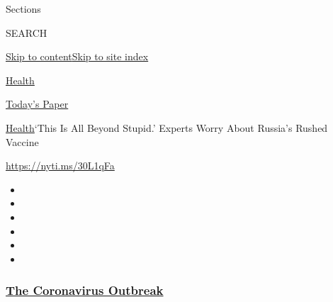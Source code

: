 Sections

SEARCH

\protect\hyperlink{site-content}{Skip to
content}\protect\hyperlink{site-index}{Skip to site index}

\href{https://www.nytimes3xbfgragh.onion/section/health}{Health}

\href{https://myaccount.nytimes3xbfgragh.onion/auth/login?response_type=cookie\&client_id=vi}{}

\href{https://www.nytimes3xbfgragh.onion/section/todayspaper}{Today's
Paper}

\href{/section/health}{Health}\textbar{}`This Is All Beyond Stupid.'
Experts Worry About Russia's Rushed Vaccine

\url{https://nyti.ms/30L1qFa}

\begin{itemize}
\item
\item
\item
\item
\item
\item
\end{itemize}

\hypertarget{the-coronavirus-outbreak}{%
\subsubsection{\texorpdfstring{\href{https://www.nytimes3xbfgragh.onion/news-event/coronavirus?name=styln-coronavirus-national\&region=TOP_BANNER\&block=storyline_menu_recirc\&action=click\&pgtype=Article\&impression_id=75bc9470-efba-11ea-81ab-99b37689be52\&variant=undefined}{The
Coronavirus
Outbreak}}{The Coronavirus Outbreak}}\label{the-coronavirus-outbreak}}

